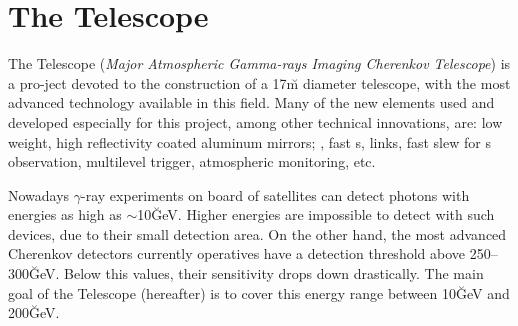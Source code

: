
\chapter{The \MAGIC Telescope}
\label{chapter:magic}

The   Telescope (\emph{Major  Atmospheric  Gamma-rays Imaging
  Cherenkov Telescope}) is a pro-ject devoted to the construction of a
17\u{m}   diameter   \Cherenkov telescope,  with   the   most advanced
technology available in this field. Many of the  new elements used and
developed  especially  for   this  project,   among  other   technical
innovations,  are: low  weight,   high reflectivity  coated   aluminum
mirrors; ,  fast s,    links,   fast  slew  for   s observation,  multilevel
trigger, atmospheric monitoring, etc.

Nowadays  $\gamma$-ray experiments on board  of  satellites can detect
photons with energies as  high as $\sim$10\u{GeV}. Higher energies are
impossible to  detect with such  devices, due to their small detection
area.  On   the  other hand, the   most   advanced Cherenkov detectors
currently operatives have a detection threshold above 250--300\u{GeV}.
Below this values, their sensitivity drops  down drastically. The main
goal   of the \MAGIC  Telescope  (\MAGIC hereafter) is   to cover this
energy range between 10\u{GeV} and 200\u{GeV}.
%
\energygapfig

